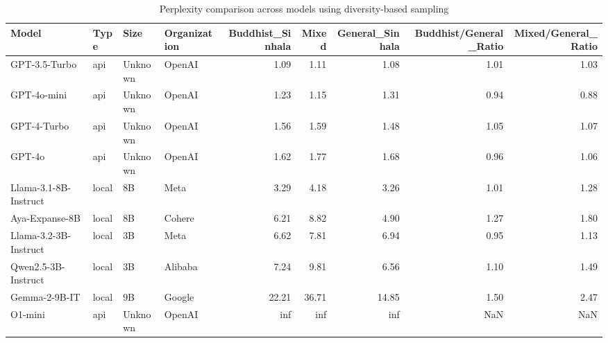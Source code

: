 \begin{table}
\caption{Perplexity comparison across models using diversity-based sampling}
\label{tab:perplexity_diversity}
\begin{tabular}{llllrrrrr}
\toprule
Model & Type & Size & Organization & Buddhist_Sinhala & Mixed & General_Sinhala & Buddhist/General_Ratio & Mixed/General_Ratio \\
\midrule
GPT-3.5-Turbo & api & Unknown & OpenAI & 1.09 & 1.11 & 1.08 & 1.01 & 1.03 \\
GPT-4o-mini & api & Unknown & OpenAI & 1.23 & 1.15 & 1.31 & 0.94 & 0.88 \\
GPT-4-Turbo & api & Unknown & OpenAI & 1.56 & 1.59 & 1.48 & 1.05 & 1.07 \\
GPT-4o & api & Unknown & OpenAI & 1.62 & 1.77 & 1.68 & 0.96 & 1.06 \\
Llama-3.1-8B-Instruct & local & 8B & Meta & 3.29 & 4.18 & 3.26 & 1.01 & 1.28 \\
Aya-Expanse-8B & local & 8B & Cohere & 6.21 & 8.82 & 4.90 & 1.27 & 1.80 \\
Llama-3.2-3B-Instruct & local & 3B & Meta & 6.62 & 7.81 & 6.94 & 0.95 & 1.13 \\
Qwen2.5-3B-Instruct & local & 3B & Alibaba & 7.24 & 9.81 & 6.56 & 1.10 & 1.49 \\
Gemma-2-9B-IT & local & 9B & Google & 22.21 & 36.71 & 14.85 & 1.50 & 2.47 \\
O1-mini & api & Unknown & OpenAI & inf & inf & inf & NaN & NaN \\
\bottomrule
\end{tabular}
\end{table}
